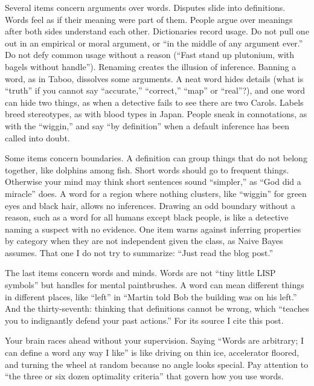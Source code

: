 Several items concern arguments over words. Disputes slide into definitions. Words feel as if their meaning were part of them. People argue over meanings after both sides understand each other. Dictionaries record usage. Do not pull one out in an empirical or moral argument, or ``in the middle of any argument ever.''  Do not defy common usage without a reason (``Fast stand up plutonium, with bagels without handle''). Renaming creates the illusion of inference. Banning a word, as in Taboo, dissolves some arguments. A neat word hides details (what is ``truth'' if you cannot say ``accurate,'' ``correct,'' ``map'' or ``real''?), and one word can hide two things, as when a detective fails to see there are two Carols. Labels breed stereotypes, as with blood types in Japan. People sneak in connotations, as with the ``wiggin,'' and say ``by definition'' when a default inference has been called into doubt.

Some items concern boundaries. A definition can group things that do not belong together, like dolphins among fish. Short words should go to frequent things. Otherwise your mind may think short sentences sound ``simpler,'' as ``God did a miracle'' does.  A word for a region where nothing clusters, like ``wiggin'' for green eyes and black hair, allows no inferences. Drawing an odd boundary without a reason, such as a word for all humans except black people, is like a detective naming a suspect with no evidence. One item warns against inferring properties by category when they are not independent given the class, as Naive Bayes assumes. That one I do not try to summarize: ``Just read the blog post.''

The last items concern words and minds. Words are not ``tiny little LISP symbols'' but handles for mental paintbrushes. A word can mean different things in different places, like ``left'' in ``Martin told Bob the building was on his left.'' And the thirty-seventh: thinking that definitions cannot be wrong, which ``teaches you to indignantly defend your past actions.'' For its source I cite this post.

Your brain races ahead without your supervision. Saying ``Words are arbitrary; I can define a word any way I like'' is like driving on thin ice, accelerator floored, and turning the wheel at random because no angle looks special.  Pay attention to ``the three or six dozen optimality criteria'' that govern how you use words.
